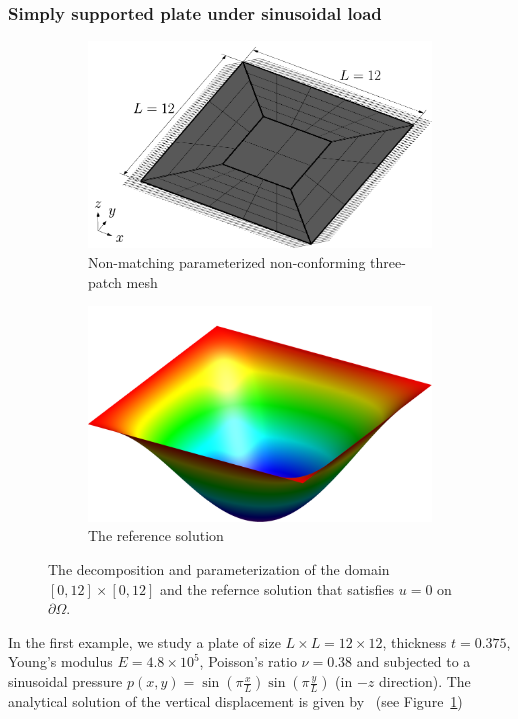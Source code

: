 \subsubsection{Simply supported plate under sinusoidal load}
\begin{figure}[h]
	\center
	\begin{subfigure}[t]{.45\linewidth}
		\center
		\includegraphics[scale=.36]{plate_config1}
		\caption{Non-matching parameterized non-conforming three-patch mesh}
	\end{subfigure}
	\begin{subfigure}[t]{.45\linewidth}
		\center
		\includegraphics[scale=.28]{plate_solution-plot}
		\caption{The reference solution}
	\end{subfigure}
	\caption{The decomposition and parameterization of the domain $\left[0, 12\right] \times \left[0, 12\right]$ and the refernce solution that satisfies $u=0$ on $\partial\Omega$.}\label{fig:kirchhoff_plate_mesh}
\end{figure}
In the first example, we study a plate of size $L\times L = 12\times 12$, thickness $t=0.375$, Young's modulus $E=4.8\times 10^5$, Poisson's ratio $\nu = 0.38$ and subjected to a sinusoidal pressure $p(x, y) = \sin(\pi \frac{x}{L})\sin(\pi \frac{y}{L})$ (in $-z$ direction). The analytical solution of the vertical displacement is given by~\cite{timoshenko1959theory} (see Figure~\ref{fig:kirchhoff_plate_mesh})
